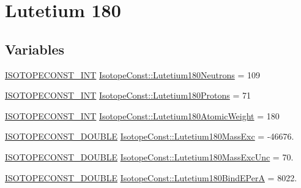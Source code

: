 \hypertarget{group___isotope_const-_lutetium-_lu180}{}\section{Lutetium 180}
\label{group___isotope_const-_lutetium-_lu180}
\subsection*{Variables}
\begin{DoxyCompactItemize}
\item 
\mbox{\hyperlink{group___isotope_const-_macros_ga5f18360b3e99483a35c32d789e62621c}{I\+S\+O\+T\+O\+P\+E\+C\+O\+N\+S\+T\+\_\+\+I\+NT}} \mbox{\hyperlink{group___isotope_const-_lutetium-_lu180_ga770cce74e7aef268d718f84292bc8734}{Isotope\+Const\+::\+Lutetium180\+Neutrons}} = 109
\item 
\mbox{\hyperlink{group___isotope_const-_macros_ga5f18360b3e99483a35c32d789e62621c}{I\+S\+O\+T\+O\+P\+E\+C\+O\+N\+S\+T\+\_\+\+I\+NT}} \mbox{\hyperlink{group___isotope_const-_lutetium-_lu180_gaa45a55092e7f0048997f917d236e0cc3}{Isotope\+Const\+::\+Lutetium180\+Protons}} = 71
\item 
\mbox{\hyperlink{group___isotope_const-_macros_ga5f18360b3e99483a35c32d789e62621c}{I\+S\+O\+T\+O\+P\+E\+C\+O\+N\+S\+T\+\_\+\+I\+NT}} \mbox{\hyperlink{group___isotope_const-_lutetium-_lu180_ga00649e779aa16e66dd76d8bcc233fd48}{Isotope\+Const\+::\+Lutetium180\+Atomic\+Weight}} = 180
\item 
\mbox{\hyperlink{group___isotope_const-_macros_ga8f45a7272ce02c0b4c65c44636ed719a}{I\+S\+O\+T\+O\+P\+E\+C\+O\+N\+S\+T\+\_\+\+D\+O\+U\+B\+LE}} \mbox{\hyperlink{group___isotope_const-_lutetium-_lu180_ga2206fd1afce32f40204fdcf497f7b20d}{Isotope\+Const\+::\+Lutetium180\+Mass\+Exc}} = -\/46676.
\item 
\mbox{\hyperlink{group___isotope_const-_macros_ga8f45a7272ce02c0b4c65c44636ed719a}{I\+S\+O\+T\+O\+P\+E\+C\+O\+N\+S\+T\+\_\+\+D\+O\+U\+B\+LE}} \mbox{\hyperlink{group___isotope_const-_lutetium-_lu180_ga9c73573d6563356ae94ffabb70156c3b}{Isotope\+Const\+::\+Lutetium180\+Mass\+Exc\+Unc}} = 70.
\item 
\mbox{\hyperlink{group___isotope_const-_macros_ga8f45a7272ce02c0b4c65c44636ed719a}{I\+S\+O\+T\+O\+P\+E\+C\+O\+N\+S\+T\+\_\+\+D\+O\+U\+B\+LE}} \mbox{\hyperlink{group___isotope_const-_lutetium-_lu180_ga00e690154aeff1852bdb0e66efc11f7e}{Isotope\+Const\+::\+Lutetium180\+Bind\+E\+PerA}} = 8022.
\item 

\end{DoxyCompactItemize}
